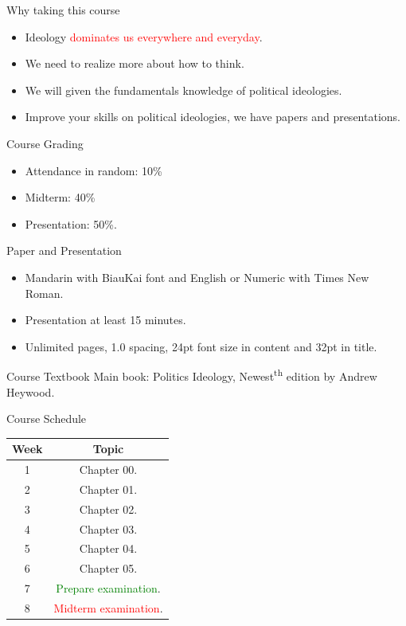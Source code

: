 \documentclass{beamer}
\begin{document}
\begin{frame}{Why taking this course}
\begin{itemize}
\item Ideology \textcolor{red}{dominates us everywhere and everyday}.
\item We need to realize more about how to think.
\item We will given the fundamentals knowledge of political ideologies.
\item Improve your skills on political ideologies, we have papers and presentations.
\end{itemize}
\end{frame}
\begin{frame}{Course Grading}
\begin{itemize}
\item Attendance in random: 10\%
\item Midterm: 40\%
\item Presentation: 50\%.
\end{itemize}
\end{frame}
\begin{frame}{Paper and Presentation}
\begin{itemize}
\item Mandarin with BiauKai font and English or Numeric with Times New Roman.
\item Presentation at least 15 minutes.
\item Unlimited pages, 1.0 spacing, 24pt font size in content and 32pt in title.
\end{itemize}
\end{frame}
\begin{frame}{Course Textbook}
Main book: Politics Ideology, Newest\textsuperscript{th} edition by Andrew Heywood. \\
\end{frame}
\begin{frame}{Course Schedule}
\begin{center}
\begin{tabular}{|c|c|}
\hline
Week & Topic \\
\hline
1 & Chapter 00.\\
\hline
2 & Chapter 01.\\
\hline
3 & Chapter 02.\\
\hline
4 & Chapter 03.\\
\hline
5 & Chapter 04.\\
\hline
6 & Chapter 05.\\
\hline
7 & \textcolor{Green}{Prepare examination}.\\
\hline
8 & \textcolor{red}{Midterm examination}.\\
\hline
\end{tabular}
\end{center}
\end{frame}
\end{document}

